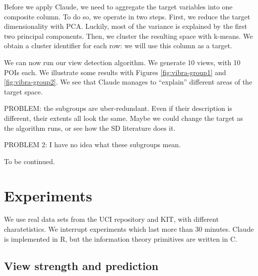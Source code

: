 Before we apply Claude, we need to aggregate the target variables into one
composite column. To do so, we operate in two steps. First, we reduce the
target dimensionality with PCA. Luckily, most of the variance is explained by
the first two principal components. Then, we cluster the resulting space with
k-means. We obtain a cluster identifier for each row: we will use this column
as a target.

We can now run our view detection algorithm. We generate 10 views, with 10 POIs
each. We illustrate some results with Figures \ref{fig:vibra-group1} and
\ref{fig:vibra-group2}. We see that Claude manages to ``explain'' different
areas of the target space.

PROBLEM: the subgroups are uber-redundant. Even if their description is
different, their extents all look the same. Maybe we could change the target
as the algorithm runs, or see how the SD literature does it.

PROBLEM 2: I have no idea what these subgroups mean.

To be continued.

\section{Experiments}

We use real data sets from the UCI repository and KIT, with different
charatetistics. We interrupt experiments which last more than 30 minutes.
Claude is implemented in R, but the information theory primitives are written
in C.

\subsection{View strength and prediction}

